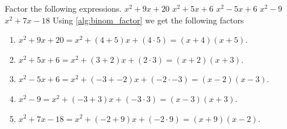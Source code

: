 \begin{ExerciseList}
\Exercise Factor the following expressions.
\Question $x^2 + 9x + 20$
\Question $x^2 + 5x + 6$
\Question $x^2 - 5x + 6$
\Question $x^2 - 9$
\Question $x^2 + 7x - 18$
\Answer Using \ref{alg:binom_factor} we get the following factors
\begin{enumerate}
\item\myindent $x^2 + 9x + 20 = x^2 + (4 + 5)x + (4\cdot5) = (x+4)(x+5)$.
\item\myindent $x^2 + 5x + 6 = x^2 + (3 + 2)x + (2\cdot3) = (x+2)(x+3)$.
\item\myindent $x^2 - 5x + 6 = x^2 + (-3 + -2)x + (-2\cdot-3) = (x-2)(x-3)$.
\item\myindent $x^2 - 9 = x^2  + (-3 + 3)x + (-3\cdot3) = (x-3)(x+3)$.
\item\myindent $x^2 + 7x - 18 = x^2 + (-2 + 9)x + (-2\cdot9) = (x+9)(x-2)$.
\end{enumerate}

\end{ExerciseList}
